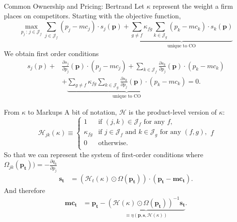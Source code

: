 \documentclass[handout, serif, aspectratio=169, 10pt]{beamer}
\begin{document}
\begin{frame}[plain]{Common Ownership and Pricing: Bertrand}
Let $\kappa$ represent the weight a firm places on competitors. Starting with the objective function,
 \begin{equation*}
 \max_{p_j \,:\, j \in \mathcal{J}_f} \sum_{j \in \mathcal{J}_f} (p_j - mc_j) \cdot s_j(\mathbf{p})+
 \underbrace{\sum_{g\neq f} \kappa_{fg} \sum_{k \in \mathcal{J}_g} (p_k - mc_k) \cdot s_k(\mathbf{p})}_{\text{unique to CO}}
 \end{equation*}
 \pause
We obtain first order conditions 
 \begin{align*}
 s_j(p) + &  \frac{\partial s_j}{\partial p_j}(\mathbf{p})  \cdot (p_j - mc_j)
 + \sum_{k \in \mathcal{J}_f} \frac{\partial s_k}{\partial p_j}(\mathbf{p})  \cdot (p_k - mc_k)\\
 & +\underbrace{\sum_{g\neq f} \kappa_{fg} \sum_{k \in \mathcal{J}_g} \frac{\partial s_k}{\partial p_j}(\mathbf{p})  \cdot (p_k - mc_k)}_{\text{unique to CO}}=0.
  \end{align*}
\end{frame}



\begin{frame}[plain,label=recoveringeta]{From $\kappa$ to Markups}
A bit of notation, $\mathcal{H}$ is the product-level version of $\kappa$:
 \begin{equation*}
 \mathcal{H}_{jk}(\kappa) \equiv
 \begin{cases}
 1 & \text{if $(j, k) \in \mathcal{J}_f$ for any $f$,} \\
 \kappa_{fg} &  \text{if $j \in \mathcal{J}_f$ and $k \in \mathcal{J}_g$  for any $(f,g)$},\\
 0 & \text{otherwise. } \\
 \end{cases}f
 \end{equation*}
So that we can represent the system of first-order conditions where $\Omega_{jk}(\mathbf{p_t})) = -\frac{\partial q_k}{\partial p_j}$
  \begin{align*}
 \mathbf{s_t} &= (\mathcal{H}_t(\kappa) \odot \Omega(\mathbf{p_t})) \cdot (\mathbf{p_t} - \mathbf{mc_t}).
 \end{align*}
And therefore
 \begin{align*}
  \mathbf{mc_t} &= \mathbf{p_t} - \underbrace{(\mathcal{H}(\kappa) \odot \Omega(\mathbf{p_t}))^{-1} \mathbf{s_t}}_{\equiv\eta(\mathbf{p},\mathbf{s},\mathcal{H}(\kappa))}.
 \end{align*}
 \end{frame}
\end{document}
